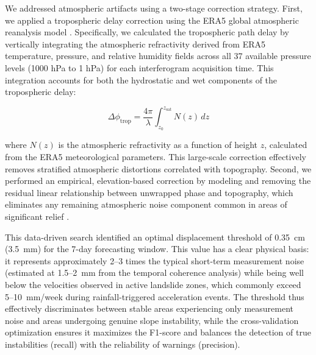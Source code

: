 We addressed atmospheric artifacts using a two-stage correction strategy. First, we applied a tropospheric delay correction using the ERA5 global atmospheric reanalysis model \citep{Bekaert2019,Liu2025}. Specifically, we calculated the tropospheric path delay by vertically integrating the atmospheric refractivity derived from ERA5 temperature, pressure, and relative humidity fields across all 37 available pressure levels (1000 hPa to 1 hPa) for each interferogram acquisition time. This integration accounts for both the hydrostatic and wet components of the tropospheric delay:

\begin{equation}
\Delta\phi_{\text{trop}} = \frac{4\pi}{\lambda} \int_{z_0}^{z_{\text{sat}}} N(z) \, dz
\end{equation}

\noindent where $N(z)$ is the atmospheric refractivity as a function of height $z$, calculated from the ERA5 meteorological parameters. This large-scale correction effectively removes stratified atmospheric distortions correlated with topography. Second, we performed an empirical, elevation-based correction by modeling and removing the residual linear relationship between unwrapped phase and topography, which eliminates any remaining atmospheric noise component common in areas of significant relief \citep{Bekaert2019}.


This data-driven search identified an optimal displacement threshold of 0.35~cm (3.5~mm) for the 7-day forecasting window. This value has a clear physical basis: it represents approximately 2–3 times the typical short-term measurement noise (estimated at 1.5–2~mm from the temporal coherence analysis) while being well below the velocities observed in active landslide zones, which commonly exceed 5–10~mm/week during rainfall-triggered acceleration events. The threshold thus effectively discriminates between stable areas experiencing only measurement noise and areas undergoing genuine slope instability, while the cross-validation optimization ensures it maximizes the F1-score and balances the detection of true instabilities (recall) with the reliability of warnings (precision).

